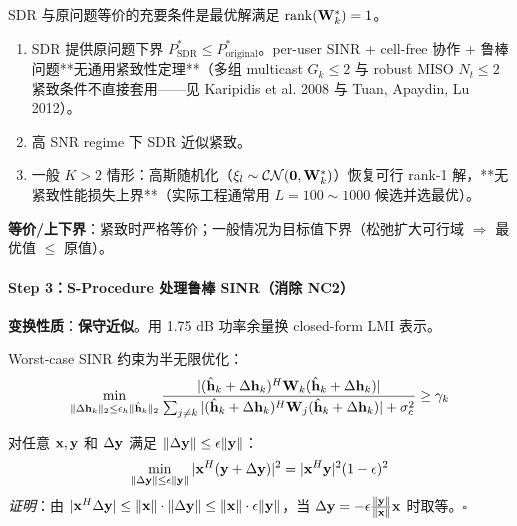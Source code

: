 \begin{proposition}\label{prop:sdr_tight}
SDR 与原问题等价的充要条件是最优解满足 $\operatorname{rank}(\mathbf{W}_k^*) = 1$。
\begin{enumerate}
    \item SDR 提供原问题下界 $P_{\text{SDR}}^* \leq P_{\text{original}}^*$。per-user SINR + cell-free 协作 + 鲁棒问题**无通用紧致性定理**（多组 multicast $G_k \leq 2$ 与 robust MISO $N_t \leq 2$ 紧致条件不直接套用——见 Karipidis et al. 2008 与 Tuan, Apaydin, Lu 2012）。
    \item 高 SNR regime 下 SDR 近似紧致。
    \item 一般 $K>2$ 情形：高斯随机化（$\xi_l \sim \mathcal{CN}(\mathbf{0}, \mathbf{W}_k^*)$）恢复可行 rank-1 解，**无紧致性能损失上界**（实际工程通常用 $L = 100 \sim 1000$ 候选并选最优）。
\end{enumerate}
\end{proposition}

\textbf{等价/上下界}：紧致时严格等价；一般情况为目标值下界（松弛扩大可行域 $\Rightarrow$ 最优值 $\leq$ 原值）。

\paragraph{Step 3：S-Procedure 处理鲁棒 SINR（消除 NC2）}
\textbf{变换性质}：\textbf{保守近似}。用 1.75 dB 功率余量换 closed-form LMI 表示。

Worst-case SINR 约束为半无限优化：
\begin{equation}
\min_{\|\Delta\mathbf{h}_k\|_2 \leq \epsilon_h \|\hat{\mathbf{h}}_k\|_2} \frac{|(\hat{\mathbf{h}}_k + \Delta\mathbf{h}_k)^H \mathbf{W}_k (\hat{\mathbf{h}}_k + \Delta\mathbf{h}_k)|}{\sum_{j\neq k}|(\hat{\mathbf{h}}_k + \Delta\mathbf{h}_k)^H \mathbf{W}_j(\hat{\mathbf{h}}_k + \Delta\mathbf{h}_k)| + \sigma_c^2} \geq \gamma_k
\end{equation}

\begin{lemma}\label{lem:cauchy_wc}
对任意 $\mathbf{x}, \mathbf{y}$ 和 $\Delta\mathbf{y}$ 满足 $\|\Delta\mathbf{y}\| \leq \epsilon\|\mathbf{y}\|$：
\begin{equation}
\min_{\|\Delta\mathbf{y}\|\leq\epsilon\|\mathbf{y}\|} |\mathbf{x}^H(\mathbf{y}+\Delta\mathbf{y})|^2 = |\mathbf{x}^H\mathbf{y}|^2 (1-\epsilon)^2
\end{equation}
\textit{证明}：由 $| \mathbf{x}^H \Delta\mathbf{y}| \leq \|\mathbf{x}\| \cdot \|\Delta\mathbf{y}\| \leq \|\mathbf{x}\| \cdot \epsilon\|\mathbf{y}\|$，当 $\Delta\mathbf{y} = -\epsilon \frac{\|\mathbf{y}\|}{\|\mathbf{x}\|} \mathbf{x}$ 时取等。$\square$
\end{lemma}


